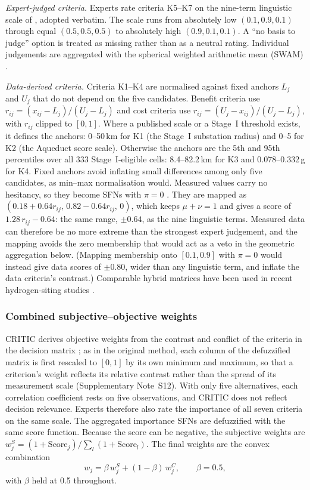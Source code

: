 \documentclass[preprint,12pt,authoryear]{elsarticle}
\begin{document}
\textit{Expert-judged criteria.} Experts rate criteria K5--K7 on the nine-term linguistic scale of \citet{kutlugundogdu2019waspas}, adopted verbatim. The scale runs from absolutely low $(0.1, 0.9, 0.1)$ through equal $(0.5, 0.5, 0.5)$ to absolutely high $(0.9, 0.1, 0.1)$. A ``no basis to judge'' option is treated as missing rather than as a neutral rating. Individual judgements are aggregated with the spherical weighted arithmetic mean (SWAM) \citep{kutlugundogdu2019waspas}.

\textit{Data-derived criteria.} Criteria K1--K4 are normalised against fixed anchors $L_j$ and $U_j$ that do not depend on the five candidates. Benefit criteria use $r_{ij} = (x_{ij} - L_j)/(U_j - L_j)$ and cost criteria use $r_{ij} = (U_j - x_{ij})/(U_j - L_j)$, with $r_{ij}$ clipped to $[0,1]$. Where a published scale or a Stage~I threshold exists, it defines the anchors: 0--50\,km for K1 (the Stage~I substation radius) and 0--5 for K2 (the Aqueduct score scale). Otherwise the anchors are the 5th and 95th percentiles over all 333 Stage~I-eligible cells: 8.4--82.2\,km for K3 and 0.078--0.332\,g for K4. Fixed anchors avoid inflating small differences among only five candidates, as min--max normalisation would. Measured values carry no hesitancy, so they become SFNs with $\pi = 0$ \citep{sharaf2023}. They are mapped as $(0.18 + 0.64 r_{ij},\, 0.82 - 0.64 r_{ij},\, 0)$, which keeps $\mu+\nu=1$ and gives a score of $1.28\,r_{ij}-0.64$: the same range, $\pm0.64$, as the nine linguistic terms. Measured data can therefore be no more extreme than the strongest expert judgement, and the mapping avoids the zero membership that would act as a veto in the geometric aggregation below. (Mapping membership onto $[0.1,0.9]$ with $\pi=0$ would instead give data scores of $\pm0.80$, wider than any linguistic term, and inflate the data criteria's contrast.) Comparable hybrid matrices have been used in recent hydrogen-siting studies \citep{du2025site,ali2026optimal}.


\subsubsection{Combined subjective--objective weights}
CRITIC derives objective weights from the contrast and conflict of the criteria in the decision matrix \citep{diakoulaki1995determining}; as in the original method, each column of the defuzzified matrix is first rescaled to $[0,1]$ by its own minimum and maximum, so that a criterion's weight reflects its relative contrast rather than the spread of its measurement scale (Supplementary Note~S12).
With only five alternatives, each correlation coefficient rests on five observations, and CRITIC does not reflect decision relevance. Experts therefore also rate the importance of all seven criteria on the same scale. The aggregated importance SFNs are defuzzified with the same score function. Because the score can be negative, the subjective weights are $w_j^{S} = (1 + \text{Score}_j)/\sum_l (1 + \text{Score}_l)$. The final weights are the convex combination \citep{ma1999,wu2021site}
\begin{equation}
w_j = \beta\, w_j^{S} + (1 - \beta)\, w_j^{C}, \qquad \beta = 0.5 ,
\end{equation}
with $\beta$ held at 0.5 throughout.
\end{document}
